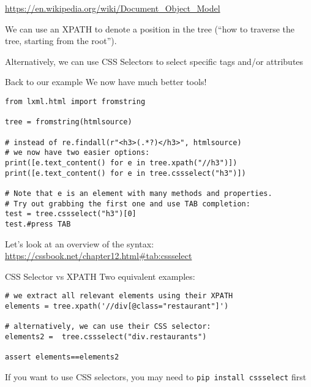 

\begin{frame}[plain]
  \tiny
  \url{https://en.wikipedia.org/wiki/Document_Object_Model}
\end{frame}



\begin{frame}[standout]
We can use an XPATH to denote a position in the tree (``how to traverse the tree, starting from the root'').
\end{frame}


\begin{frame}[standout]
Alternatively, we can use CSS Selectors to select specific tags and/or attributes
\end{frame}



\begin{frame}[fragile]{Back to our example}
We now have much better tools!

\begin{verbatim}
from lxml.html import fromstring

tree = fromstring(htmlsource)

# instead of re.findall(r"<h3>(.*?)</h3>", htmlsource)
# we now have two easier options:
print([e.text_content() for e in tree.xpath("//h3")])
print([e.text_content() for e in tree.cssselect("h3")])

# Note that e is an element with many methods and properties.
# Try out grabbing the first one and use TAB completion:
test = tree.cssselect("h3")[0]
test.#press TAB
\end{verbatim}

\end{frame}


\begin{frame}[standout]
Let's look at an overview of the syntax: \url{https://cssbook.net/chapter12.html\#tab:cssselect}
\end{frame}



\begin{frame}[fragile]{CSS Selector vs XPATH }
Two equivalent examples:
\begin{verbatim}
# we extract all relevant elements using their XPATH
elements = tree.xpath('//div[@class="restaurant"]')

# alternatively, we can use their CSS selector:
elements2 =  tree.cssselect("div.restaurants")

assert elements==elements2
\end{verbatim}

\tiny{If you want to use CSS selectors, you may need to \texttt{pip install cssselect} first}
\end{frame}



